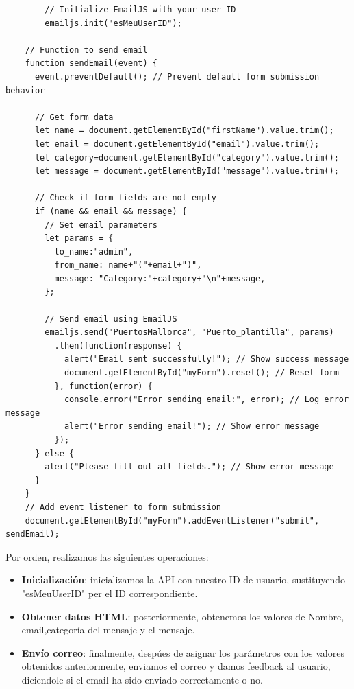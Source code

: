 \documentclass{article}
\begin{document}
    \begin{verbatim}
        // Initialize EmailJS with your user ID
        emailjs.init("esMeuUserID");

    // Function to send email
    function sendEmail(event) {
      event.preventDefault(); // Prevent default form submission behavior
    
      // Get form data
      let name = document.getElementById("firstName").value.trim();
      let email = document.getElementById("email").value.trim();
      let category=document.getElementById("category").value.trim();
      let message = document.getElementById("message").value.trim();
    
      // Check if form fields are not empty
      if (name && email && message) {
        // Set email parameters
        let params = {
          to_name:"admin",
          from_name: name+"("+email+")",
          message: "Category:"+category+"\n"+message,
        };
    
        // Send email using EmailJS
        emailjs.send("PuertosMallorca", "Puerto_plantilla", params)
          .then(function(response) {
            alert("Email sent successfully!"); // Show success message
            document.getElementById("myForm").reset(); // Reset form
          }, function(error) {
            console.error("Error sending email:", error); // Log error message
            alert("Error sending email!"); // Show error message
          });
      } else {
        alert("Please fill out all fields."); // Show error message
      }
    }
    // Add event listener to form submission
    document.getElementById("myForm").addEventListener("submit", sendEmail);
    \end{verbatim}

    Por orden, realizamos las siguientes operaciones:

    \begin{itemize}
        \item \textbf{Inicialización}: inicializamos la API con nuestro ID de usuario, sustituyendo "esMeuUserID" per el ID correspondiente. 
        \item \textbf{Obtener datos HTML}: posteriormente, obtenemos los valores de Nombre, email,categoría del mensaje y el mensaje.
        \item \textbf{Envío correo}: finalmente, despúes de asignar los parámetros con los valores obtenidos anteriormente, enviamos el correo y damos feedback al usuario, diciendole si el email ha sido enviado correctamente o no.
        
    \end{itemize}
\end{document}
